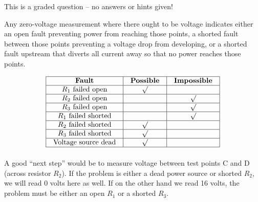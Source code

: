 \vfil 

\eject






This is a graded question -- no answers or hints given!







Any zero-voltage measurement where there ought to be voltage indicates either an open fault preventing power from reaching those points, a shorted fault between those points preventing a voltage drop from developing, or a shorted fault upstream that diverts all current away so that no power reaches those points.


$$\vbox{\offinterlineskip
\halign{\strut
\vrule \quad\hfil # \ \hfil & 
\vrule \quad\hfil # \ \hfil & 
\vrule \quad\hfil # \ \hfil \vrule \cr
\noalign{\hrule}
%
{\bf Fault} & {\bf Possible} & {\bf Impossible} \cr
%
\noalign{\hrule}
%
$R_1$ failed open & $\surd$ &  \cr
%
\noalign{\hrule}
%
$R_2$ failed open &  & $\surd$ \cr
%
\noalign{\hrule}
%
$R_3$ failed open &  & $\surd$ \cr
%
\noalign{\hrule}
%
$R_1$ failed shorted &  & $\surd$ \cr
%
\noalign{\hrule}
%
$R_2$ failed shorted & $\surd$ &  \cr
%
\noalign{\hrule}
%
$R_3$ failed shorted & $\surd$ &  \cr
%
\noalign{\hrule}
%
Voltage source dead & $\surd$ &  \cr
%
\noalign{\hrule}
} %
}$$ %

A good ``next step'' would be to measure voltage between test points C and D (across resistor $R_2$).  If the problem is either a dead power source or shorted $R_2$, we will read 0 volts here as well.  If on the other hand we read 16 volts, the problem must be either an open $R_1$ or a shorted $R_3$.



